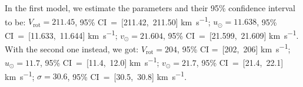 In the first model, we estimate the parameters and their 95\% confidence interval to be: %
$V_{\text{rot}} = 211.45$, 95\% CI~=~[211.42,~211.50] \unit{\kilo\meter\per\second}; 
$u_{\odot} = 11.638$, 95\% CI~=~[11.633,~11.644] \unit{\kilo\meter\per\second}; 
$v_{\odot} = 21.604$, 95\% CI~=~[21.599,~21.609] \unit{\kilo\meter\per\second}. 
With the second one instead, we got: 
$V_{\text{rot}}= 204$, 95\% CI =~[202,~206] \unit{\kilo\meter\per\second}; 
$u_{\odot} = 11.7$, 95\% CI~=~[11.4,~12.0] \unit{\kilo\meter\per\second}; 
$v_{\odot} = 21.7$, 95\% CI~=~[21.4,~22.1] \unit{\kilo\meter\per\second}; 
$\sigma = 30.6$, 95\% CI~=~[30.5,~30.8] \unit{\kilo\meter\per\second}.